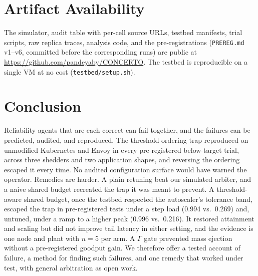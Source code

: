 \documentclass[conference]{IEEEtran}
\begin{document}
\section{Artifact Availability}
The simulator, audit table with per-cell source URLs, testbed manifests,
trial scripts, raw replica traces, analysis code, and the pre-registrations
(\texttt{PREREG.md} v1--v6, committed before the corresponding runs) are public at
\url{https://github.com/pandeyaby/CONCERTO}. The testbed is reproducible on a
single VM at no cost (\texttt{testbed/setup.sh}).

\section{Conclusion}
Reliability agents that are each correct can fail together, and the
failures can be predicted, audited, and reproduced. The threshold-ordering
trap reproduced on unmodified Kubernetes and Envoy in every pre-registered
below-target trial, across three shedders and two application shapes, and
reversing the ordering escaped it every time. No audited configuration surface
would have warned the operator. Remedies are harder. A plain retuning beat our
simulated arbiter, and a naive shared budget recreated the trap it was meant
to prevent. A threshold-aware shared budget, once the testbed respected the
autoscaler's tolerance band, escaped the trap in pre-registered tests under a step load (0.994 vs.\
0.269) and, untuned, under a ramp to a higher peak (0.996 vs.\ 0.216). It
restored attainment and scaling but did not improve tail latency in either
setting, and the evidence is one node and plant with $n=5$ per arm. A $\Gamma$ gate
prevented mass ejection without a pre-registered goodput gain. We therefore
offer a tested account of failure, a method for finding such failures, and
one remedy that worked under test, with general arbitration as open work.
\end{document}
